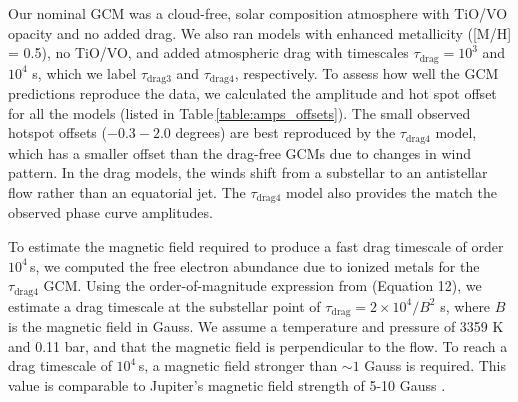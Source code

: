 \documentclass[twocolumn, trackchanges]{aastex61}
\begin{document}
Our nominal GCM was a cloud-free, solar composition atmosphere with TiO/VO opacity and no added drag.  We also ran models with enhanced metallicity ([M/H] = 0.5), no TiO/VO, and added atmospheric drag with timescales $\tau_\mathrm{drag} = 10^3$ and $10^4$ s, which we label $\tau_\mathrm{drag3}$ and $\tau_\mathrm{drag4}$, respectively.  To assess how well the GCM predictions reproduce the data, we calculated the amplitude and hot spot offset for all the models (listed in Table\,\ref{table:amps_offsets}). The small observed hotspot offsets ($-0.3 - 2.0$ degrees) are best reproduced by the $\tau_\mathrm{drag4}$ model, which has a smaller offset than the drag-free GCMs due to changes in wind pattern. In the drag models, the winds shift from a substellar to an antistellar flow rather than an equatorial jet.  The $\tau_\mathrm{drag4}$ model also provides the match the observed phase curve amplitudes. 


To estimate the magnetic field required to produce a fast drag timescale of order $10^4$\,s, we computed the free electron abundance due to ionized metals for the $\tau_\mathrm{drag4}$ GCM. Using the order-of-magnitude expression from \cite{perna10} (Equation 12), we estimate a drag timescale at the substellar point of $\tau_\mathrm{drag}  = 2\times10^4/B^2$ s, where $B$ is the magnetic field in Gauss. We assume a temperature and pressure of 3359 K and 0.11 bar, %
and that the magnetic field is perpendicular to the flow. To reach a drag timescale of $10^4$\,s, a magnetic field stronger than $\sim1$ Gauss is required. This value is comparable to Jupiter's magnetic field strength of 5-10 Gauss \citep{bagenal04}.
\end{document}
